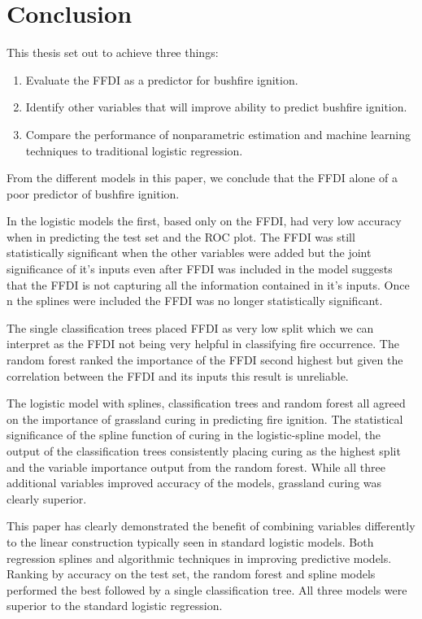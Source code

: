 \documentclass[11pt,a4paper]{article}
\begin{document}
\section{Conclusion}

This thesis set out to achieve three things:
\begin{enumerate}
  \item Evaluate the FFDI as a predictor for bushfire ignition.
  \item Identify other variables that will improve ability to predict bushfire ignition.
  \item Compare the performance of nonparametric estimation and machine learning techniques to traditional logistic regression.
\end{enumerate}

From the different models in this paper, we conclude that the FFDI alone of a poor predictor of bushfire ignition.

In the logistic models the first, based only on the FFDI, had very low accuracy when  in predicting the test set and the ROC plot. The FFDI was still statistically significant when the other variables were added but the joint significance of it's inputs even after FFDI was included in the model suggests that the FFDI is not capturing all the information contained in it's inputs. Once n the splines were included the FFDI was no longer statistically significant.

The single classification trees placed FFDI as very low split which we can interpret as the FFDI not being very helpful in classifying fire occurrence. The random forest ranked the importance of the FFDI second highest but given the correlation between the FFDI and its inputs this result is unreliable.

The logistic model with splines, classification trees and random forest all agreed on the importance of grassland curing in predicting fire ignition. The statistical significance of the spline function of curing in the logistic-spline model, the output of the classification trees consistently placing curing as the highest split and the variable importance output from the random forest. While all three additional variables improved accuracy of the models, grassland curing was clearly superior.

This paper has clearly demonstrated the benefit of combining variables differently to the linear construction typically seen in standard logistic models. Both regression splines and algorithmic techniques in improving predictive models. Ranking by accuracy on the test set, the random forest and spline models performed the best followed by a single classification tree. All three models were superior to the standard logistic regression.
\end{document}
